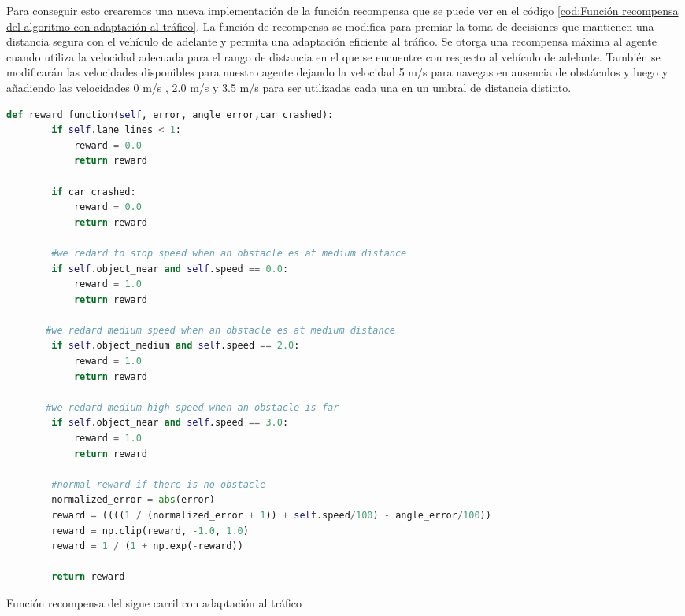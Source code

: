 Para conseguir esto crearemos una nueva implementación de la función recompensa que se puede ver en el código \ref{cod:Función recompensa del algoritmo con adaptación al tráfico}. La función de recompensa se modifica para premiar la toma de decisiones que mantienen una distancia segura con el vehículo de adelante y permita una adaptación eficiente al tráfico. Se otorga una recompensa máxima al agente cuando utiliza la velocidad adecuada para el rango de distancia en el que se encuentre con respecto al vehículo de adelante. También se modificarán las velocidades disponibles para nuestro agente dejando la velocidad 5 m/s para navegas en ausencia de obstáculos y luego y añadiendo las velocidades  0 m/s , 2.0 m/s  y 3.5 m/s para ser utilizadas cada una en un umbral de distancia distinto.

\bigskip

\begin{code}[H]
	\begin{lstlisting}[language=Python]
    def reward_function(self, error, angle_error,car_crashed):
        if self.lane_lines < 1:
            reward = 0.0
            return reward
            
        if car_crashed:
            reward = 0.0
            return reward
            
        #we redard to stop speed when an obstacle es at medium distance
        if self.object_near and self.speed == 0.0:
            reward = 1.0
            return reward
            
       #we redard medium speed when an obstacle es at medium distance
        if self.object_medium and self.speed == 2.0:
            reward = 1.0
            return reward
            
       #we redard medium-high speed when an obstacle is far
        if self.object_near and self.speed == 3.0:
            reward = 1.0
            return reward
        
        #normal reward if there is no obstacle
        normalized_error = abs(error)
        reward = ((((1 / (normalized_error + 1)) + self.speed/100) - angle_error/100))
        reward = np.clip(reward, -1.0, 1.0)
        reward = 1 / (1 + np.exp(-reward))

        return reward 
	\end{lstlisting}

\caption[Función recompensa del sigue carril con adaptación al tráfico]{Función recompensa del sigue carril con adaptación al tráfico}
\label{cod:Función recompensa del algoritmo con adaptación al tráfico}
\end{code}

